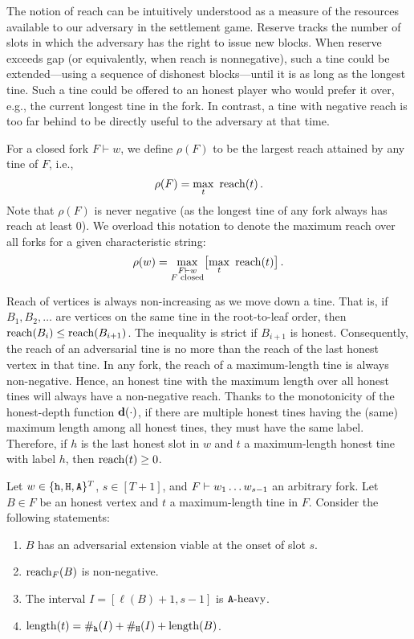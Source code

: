 The notion of reach can be intuitively understood as a measure of
the resources available to our adversary in the settlement
game. Reserve tracks the number of slots in which the adversary has
the right to issue new blocks.  When reserve exceeds gap (or
equivalently, when reach is nonnegative), such a tine could be
extended---using a sequence of dishonest blocks---until it is as long
as the longest tine. Such a tine could be offered to an honest player
who would prefer it over, e.g., the current longest tine in the
fork. In contrast, a tine with negative reach is too far behind to be
directly useful to the adversary at that time.

\begin{definition}
For a closed fork $F\vdash w$, we define $\rho(F)$ to be the largest reach attained by any tine of $F$, i.e., 
\[
\rho(F)=\underset{t}\max \ \reach(t)\,.
\]
Note that $\rho(F)$ is never negative (as the longest tine of any fork always has reach at least 0). We overload this notation to denote the maximum reach over all forks for a given characteristic string: 
\[
\rho(w)=\underset{\substack{F\vdash w\\\text{$F$ closed}}}\max\big[\underset{t}\max \ \operatorname{reach}(t)\big]\,.
\]
\end{definition}

Reach of vertices is always non-increasing as we move down a tine. 
That is, if $B_1, B_2, \ldots$ are vertices on the same tine in the root-to-leaf order, then 
$\operatorname{reach}(B_i) \leq \operatorname{reach}(B_{i+1})$. 
The inequality is strict if $B_{i + 1}$ is honest. 
Consequently, the reach of an adversarial tine is no more than 
the reach of the last honest vertex in that tine. 
In any fork, the reach of a maximum-length tine is always non-negative. 
Hence, an honest tine with the maximum length over all honest tines 
will always have a non-negative reach. 
Thanks to the monotonicity of the honest-depth function $\mathbf{d}(\cdot)$, 
if there are multiple honest tines 
having the (same) maximum length among all honest tines, 
they must have the same label. 
Therefore, if $h$ is the last honest slot in $w$ and 
$t$ a maximum-length honest tine with label $h$,  
then $\operatorname{reach}(t) \geq 0$. 



Let $w \in \{\mathtt{h}, \mathtt{H}, \mathtt{A}\}^T$,   
$s \in [T + 1]$, and 
$F \vdash w_1 \ldots w_{s - 1}$ an arbitrary fork. 
Let $B \in F$ be an honest vertex 
and $t$ a maximum-length tine in $F$.
Consider the following statements: 
\begin{enumerate}[label=(\alph*)]
  \item \label{fact-reach-part:viable-adv-ext} $B$ has an adversarial extension viable at the onset of slot $s$.
  \item \label{fact-reach-part:nonneg-reach} $\operatorname{reach}_{F}(B)$ is non-negative.
  \item \label{fact-reach-part:Aheavy} The interval $I = [\ell(B) + 1, s - 1]$ is $\mathtt{A}\text{-heavy}$. 
  \item \label{fact-reach-part:conservative} $\operatorname{length}(t) = \#_{\mathtt{h}}(I) + \#_{\mathtt{H}}(I) + \operatorname{length}(B)$.     
\end{enumerate}

